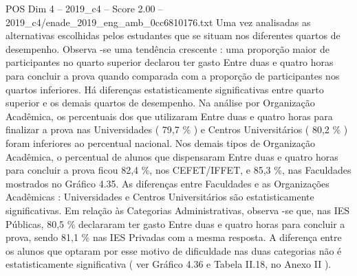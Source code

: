 \begin{textsample}{POS Dim 4 – 2019\_c4 – Score 2.00 – 2019\_c4/enade\_2019\_eng\_amb\_0cc6810176.txt}
Uma vez analisadas as alternativas escolhidas pelos estudantes que se situam nos diferentes quartos de desempenho.
Observa -se uma tendência crescente : uma proporção maior de participantes no quarto superior declarou ter gasto Entre duas e quatro horas para concluir a prova quando comparada com a proporção de participantes nos quartos inferiores.
Há diferenças estatisticamente significativas entre quarto superior e os demais quartos de desempenho.
Na análise por Organização Acadêmica, os percentuais dos que utilizaram Entre duas e quatro horas para finalizar a prova nas Universidades ( 79,7 \% ) e Centros Universitários ( 80,2 \% ) foram inferiores ao percentual nacional.
Nos demais tipos de Organização Acadêmica, o percentual de alunos que dispensaram Entre duas e quatro horas para concluir a prova ficou 82,4 \%, nos CEFET/IFFET, e 85,3 \%, nas Faculdades mostrados no Gráfico 4.35.
As diferenças entre Faculdades e as Organizações Acadêmicas : Universidades e Centros Universitários são estatisticamente significativas.
Em relação às Categorias Administrativas, observa -se que, nas IES Públicas, 80,5 \% declararam ter gasto Entre duas e quatro horas para concluir a prova, sendo 81,1 \% nas IES Privadas com a mesma resposta.
A diferença entre os alunos que optaram por esse motivo de dificuldade nas duas categorias não é estatisticamente significativa ( ver Gráfico 4.36 e Tabela II.18, no Anexo II ).

\end{textsample}
